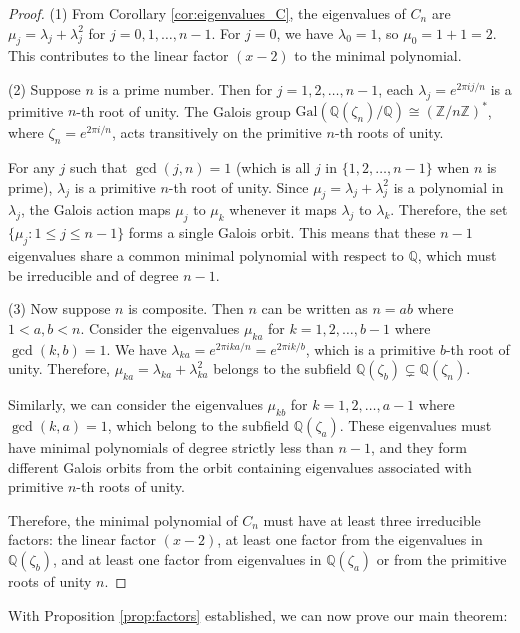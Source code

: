 \begin{proof}
(1) From Corollary \ref{cor:eigenvalues_C}, the eigenvalues of $C_n$ are $\mu_j = \lambda_j + \lambda_j^2$ for $j = 0, 1, \ldots, n-1$. For $j = 0$, we have $\lambda_0 = 1$, so $\mu_0 = 1 + 1 = 2$. This contributes to the linear factor $(x-2)$ to the minimal polynomial.

(2) Suppose $n$ is a prime number. Then for $j = 1, 2, \ldots, n-1$, each $\lambda_j = e^{2\pi i j/n}$ is a primitive $n$-th root of unity. The Galois group $\text{Gal}(\mathbb{Q}(\zeta_n)/\mathbb{Q}) \cong (\mathbb{Z}/n\mathbb{Z})^*$, where $\zeta_n = e^{2\pi i/n}$, acts transitively on the primitive $n$-th roots of unity.

For any $j$ such that $\gcd(j,n) = 1$ (which is all $j$ in $\{1,2,\ldots,n-1\}$ when $n$ is prime), $\lambda_j$ is a primitive $n$-th root of unity. Since $\mu_j = \lambda_j + \lambda_j^2$ is a polynomial in $\lambda_j$, the Galois action maps $\mu_j$ to $\mu_k$ whenever it maps $\lambda_j$ to $\lambda_k$. Therefore, the set $\{\mu_j : 1 \leq j \leq n-1\}$ forms a single Galois orbit. This means that these $n-1$ eigenvalues share a common minimal polynomial with respect to $\mathbb{Q}$, which must be irreducible and of degree $n-1$.

(3) Now suppose $n$ is composite. Then $n$ can be written as $n = ab$ where $1 < a, b < n$. Consider the eigenvalues $\mu_{ka}$ for $k = 1, 2, \ldots, b-1$ where $\gcd(k,b) = 1$. We have $\lambda_{ka} = e^{2\pi i ka/n} = e^{2\pi i k/b}$, which is a primitive $b$-th root of unity. Therefore, $\mu_{ka} = \lambda_{ka} + \lambda_{ka}^2$ belongs to the subfield $\mathbb{Q}(\zeta_b) \subsetneq \mathbb{Q}(\zeta_n)$.

Similarly, we can consider the eigenvalues $\mu_{kb}$ for $k = 1, 2, \ldots, a-1$ where $\gcd(k,a) = 1$, which belong to the subfield $\mathbb{Q}(\zeta_a)$. These eigenvalues must have minimal polynomials of degree strictly less than $n-1$, and they form different Galois orbits from the orbit containing eigenvalues associated with primitive $n$-th roots of unity.

Therefore, the minimal polynomial of $C_n$ must have at least three irreducible factors: the linear factor $(x-2)$, at least one factor from the eigenvalues in $\mathbb{Q}(\zeta_b)$, and at least one factor from eigenvalues in $\mathbb{Q}(\zeta_a)$ or from the primitive roots of unity $n$.
\end{proof}

With Proposition \ref{prop:factors} established, we can now prove our main theorem:

